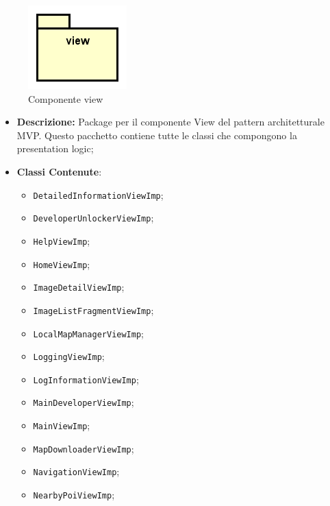 \documentclass[../DefinizioneDiProdotto.tex]{subfiles}
\begin{document}
    \begin{figure}[H]
        \centering
        \includegraphics{img/package/view.png}
        \caption{Componente view}\label{fig:view} 
    \end{figure}
    \begin{itemize}
\item \textbf{Descrizione:} Package per il componente View del pattern architetturale MVP. Questo pacchetto contiene tutte le classi che compongono la presentation logic;
\item \textbf{Classi Contenute}:
\begin{itemize}
\item \texttt{DetailedInformationViewImp};

\item \texttt{DeveloperUnlockerViewImp};

\item \texttt{HelpViewImp};

\item \texttt{HomeViewImp};

\item \texttt{ImageDetailViewImp};

\item \texttt{ImageListFragmentViewImp};

\item \texttt{LocalMapManagerViewImp};

\item \texttt{LoggingViewImp};

\item \texttt{LogInformationViewImp};

\item \texttt{MainDeveloperViewImp};

\item \texttt{MainViewImp};

\item \texttt{MapDownloaderViewImp};

\item \texttt{NavigationViewImp};

\item \texttt{NearbyPoiViewImp};


\end{itemize}
\end{itemize}
\end{document}
